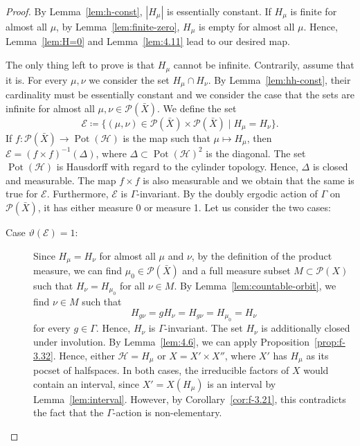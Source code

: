 \begin{proof}
  By Lemma~\ref{lem:h-const}, \(|H_\mu|\) is essentially constant.
  If \(H_\mu\) is finite for almost all \(\mu\), by Lemma~\ref{lem:finite-zero}, \(H_\mu\) is empty for almost all \(\mu\). Hence, Lemma~\ref{lem:H=0} and Lemma~\ref{lem:4.11} lead to our desired map.

  The only thing left to prove is that \(H_\mu\) cannot be infinite. Contrarily, assume that it is. For every \(\mu, \nu\) we consider the set \(H_\mu \cap H_\nu\). By Lemma~\ref{lem:hh-const}, their cardinality must be essentially constant and we consider the case that the sets are infinite for almost all \(\mu, \nu \in \mathcal{P}(\bar X)\).
  We define the set
  \[
    \mathcal{E} \coloneqq \{(\mu, \nu) \in \mathcal{P}(\bar X) \times \mathcal{P}(\bar X)\mid H_\mu = H_\nu\}.
  \]
  If \(f\colon \mathcal{P}(\bar X) \to \operatorname{Pot}(\mathcal{H})\) is the map such that  \(\mu \mapsto H_\mu\), then \(\mathcal{E} = (f \times f)^{-1}(\Delta)\), where \(\Delta \subset \operatorname{Pot}(\mathcal{H})^2\) is the diagonal. The set \(\operatorname{Pot}(\mathcal{H})\) is Hausdorff with regard to the cylinder topology. Hence, \(\Delta\) is closed and measurable. The map \(f \times f\) is also measurable and we obtain that the same is true for \(\mathcal{E}\). Furthermore, \(\mathcal{E}\) is \(\Gamma\)-invariant.  By the doubly ergodic action of \(\Gamma\) on \(\mathcal{P}(\bar X)\), it has either measure 0 or measure 1. Let us consider the two cases:
  \begin{description}
  \item[Case \(\vartheta(\mathcal{E})=1\):] Since \(H_\mu = H_\nu\) for almost all \(\mu\) and \(\nu\), by the definition of the product measure, we can find \(\mu_0 \in \mathcal{P}(\bar X)\) and a full measure subset \(M \subset \mathcal{P}(X)\) such that \(H_\nu = H_{\mu_0}\) for all \(\nu \in M\). By Lemma~\ref{lem:countable-orbit}, we find \(\nu \in M\) such that
    \[
      H_{g\nu} = gH_\nu = H_{g\nu} = H_{\mu_0} = H_\nu
    \]
    for every \(g \in \Gamma\). Hence, \(H_\nu\) is \(\Gamma\)-invariant. The set \(H_\nu\) is additionally closed under involution. By Lemma~\ref{lem:4.6}, we can apply Proposition~\ref{prop:f-3.32}. Hence, either \(\mathcal{H} = H_\mu\) or \(X = X' \times X''\), where \(X'\) has \(H_\mu\) as its pocset of halfspaces. In both cases, the irreducible factors of \(X\) would contain an interval, since \(X'=X(H_\mu)\) is an interval by Lemma~\ref{lem:interval}. However, by Corollary~\ref{cor:f-3.21}, this contradicts the fact that the \(\Gamma\)-action is non-elementary.

\end{description}
\end{proof}
